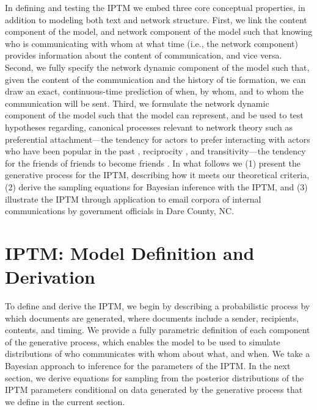In defining and testing the IPTM we embed three core conceptual properties, in addition to modeling both text and network structure. First, we link the content component of the model, and network component of the model such that knowing who is communicating with whom at what time (i.e., the network component) provides information about the content of communication,  and vice versa. Second, we fully specify the network dynamic component of the model such that, given the content of the communication and the history of tie formation, we can draw an exact, continuous-time prediction of when, by whom, and to whom the communication will be sent. Third, we formulate the network dynamic component of the model such that the model can represent, and be used to test hypotheses regarding, canonical processes relevant to network theory such as preferential attachment---the tendency for actors to prefer interacting with actors who have been popular in the past \citep{barabasi1999emergence,vazquez2003growing,jeong2003measuring}, reciprocity \citep{hammer1985implications,rao1987measures}, and transitivity---the tendency for the friends of friends to become friends \citep{louch2000personal,burda2004network}. In what follows we (1) present the generative process for the IPTM, describing how it meets our theoretical criteria, (2) derive the sampling equations for Bayesian inference with the IPTM, and (3) illustrate the IPTM through application to email corpora of internal communications by government officials in Dare County, NC. 

\section{IPTM: Model Definition and Derivation} \label{sec: Generative Process}

To define and derive the IPTM, we begin by describing a probabilistic process by which documents are generated, where documents include a sender, recipients, contents, and timing. We provide a fully parametric definition of each component of the generative process, which enables the model to be used to simulate distributions of who communicates with whom about what, and when. We take a Bayesian approach to inference for the parameters of the IPTM. In the next section, we derive equations for sampling from the posterior distributions of the IPTM parameters conditional on data generated by the generative process that we define in the current section.

